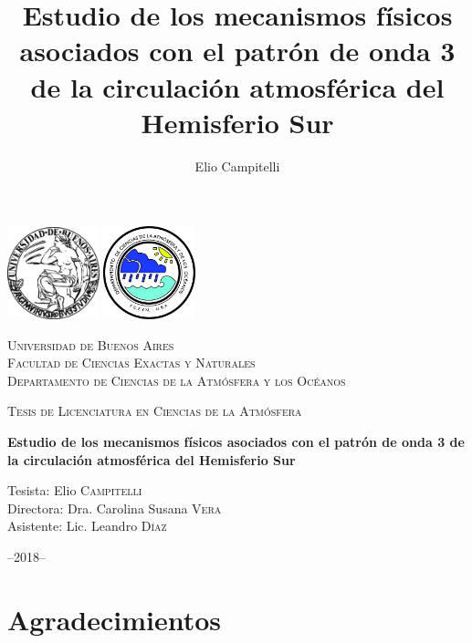 \documentclass[spanish,a4paper,12pt,oneside]{book}
\title{Estudio de los mecanismos físicos asociados con el patrón de onda 3 de
la circulación atmosférica del Hemisferio Sur}
\author{Elio Campitelli}
\date{}
\begin{document}
\maketitle

\frontmatter

\begin{titlepage}
    \centering
    \includegraphics[width=0.2\textwidth]{logoUBA}  \hfill \includegraphics[width=0.2\textwidth]{logoDCAO} \par
    \vspace{0.5cm}
    {\scshape\LARGE Universidad de Buenos Aires  \\
    \large Facultad de Ciencias Exactas y Naturales \\
Departamento de Ciencias de la Atmósfera y los Océanos  \par}
    \vspace{0.5cm}
    {\scshape\Large Tesis de Licenciatura en Ciencias de la Atmósfera\par}
    \vspace{1cm}
    {\huge\bfseries Estudio de los mecanismos físicos asociados con el patrón de onda 3 de la circulación atmosférica del Hemisferio Sur\par}
    \vspace{1.5cm}
    {\Large Tesista: Elio \textsc{Campitelli} \\
        Directora:  Dra. Carolina Susana \textsc{Vera} \\
        Asistente: Lic. Leandro \textsc{Díaz}
    \par}
    \vfill

    {\large --2018--\par}
\end{titlepage}

\chapter*{Agradecimientos}
\end{document}
